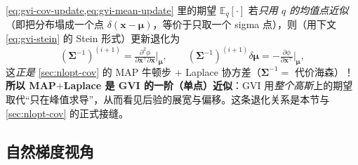 \begin{insight}
\cref{eq:gvi-cov-update,eq:gvi-mean-update} 里的期望 $\mathbb{E}_q[\cdot]$ 若\emph{只用 $q$ 的均值点近似}（即把分布塌成一个点 $\delta(\mathbf{x}-\boldsymbol{\mu})$，等价于只取一个 sigma 点），则（用下文 \cref{eq:gvi-stein} 的 Stein 形式）更新退化为
\[
  (\boldsymbol{\Sigma}^{-1})^{(i+1)}=\tfrac{\partial^2\phi}{\partial\mathbf{x}^\top\partial\mathbf{x}}\Big|_{\boldsymbol{\mu}},\qquad
  (\boldsymbol{\Sigma}^{-1})^{(i+1)}\delta\boldsymbol{\mu}=-\tfrac{\partial\phi}{\partial\mathbf{x}^\top}\Big|_{\boldsymbol{\mu}},
\]
这\emph{正是} \cref{sec:nlopt-cov} 的 MAP 牛顿步 $+$ Laplace 协方差（$\boldsymbol{\Sigma}^{-1}=$ 代价海森）！\textbf{所以 MAP$+$Laplace 是 GVI 的一阶（单点）近似}：GVI 用\emph{整个高斯}上的期望取代“只在峰值求导”，从而看见后验的展宽与偏移。这条退化关系是本节与 \cref{sec:nlopt-cov} 的正式接缝。
\end{insight}

\subsection{自然梯度视角}
\label{sec:nlopt-gvi-natgrad}

